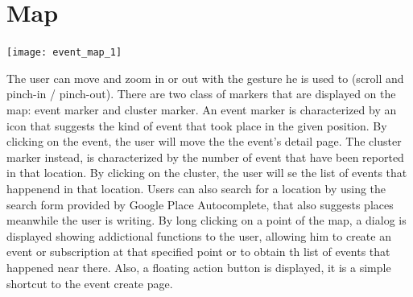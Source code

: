 \documentclass[a4paper]{scrreprt}
\begin{document}
\section{Map}
\begin{minipage}{0.5\textwidth}
	\centering
	\texttt{[image: event\_map\_1]}
\end{minipage}
\begin{minipage}{0.5\textwidth}
	 The user can move and zoom in or out with the gesture he is used to (scroll and pinch-in / pinch-out). There are two class of markers that are displayed on the map: event marker and cluster marker. An event marker is characterized by an icon that suggests the kind of event that took place in the given position. By clicking on the event, the user will move the the event's detail page. The cluster marker instead, is characterized by the number of event that have been reported in that location. By clicking on the cluster, the user will se the list of events that happenend in that location. Users can also search for a  location by using the search form provided by Google Place Autocomplete, that also suggests places meanwhile the user is writing. By long clicking on a point of the map, a dialog is displayed showing addictional functions to the user, allowing him to create an event or subscription at that specified point or to obtain th list of events that happened near there. Also, a floating action button is displayed, it is a simple shortcut to the event create page.
\end{minipage}
\end{document}
